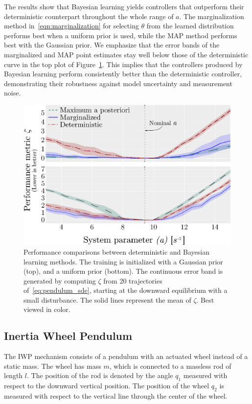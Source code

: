 The results show that Bayesian learning yields controllers that outperform 
their deterministic counterpart throughout the whole range of $a$.
%
The marginalization method in~\eqref{eqn:marginalization} for selecting $\theta$
from the learned distribution performs best when a uniform prior is used, while
the MAP method performs best with the Gaussian prior.
%
We emphasize that the error bands of the marginalized and MAP point
estimates stay well below those of the deterministic curve in the top plot of
Figure~\ref{fig:bayes_compare}.
%
This implies that the controllers produced by Bayesian learning perform
consistently better than the deterministic controller, demonstrating their
robustness against model uncertainty and measurement noise.


\begin{figure}[tb]
    \centering
    \includegraphics[width=0.7\linewidth]{figures/H_combined.eps}
    \caption{
        Performance comparisons between deterministic and Bayesian learning
        methods. 
        The training is initialized with a Gaussian prior (top), and a
        uniform prior (bottom). 
        The continuous error band is generated by computing $\zeta$ from 20
        trajectories of~\eqref{eq:pendulum_sde}, starting at the downward
        equilibrium with a small disturbance. 
        The solid lines represent the mean of $\zeta$. 
        Best viewed in color.
    }
    \label{fig:bayes_compare}
\end{figure}

\subsection{Inertia Wheel Pendulum}
\label{subsec:iwp}

The IWP mechanism consists of a pendulum with an actuated wheel instead of a static
mass.
%
The wheel has mass $m$, which is connected to a massless rod of length \(l\). 
%
The position of the rod is denoted by the angle \(q_1\) measured with
respect to the downward vertical position.
%
The position of the wheel \(q_2\) is measured with respect to the vertical
line through the center of the wheel.

